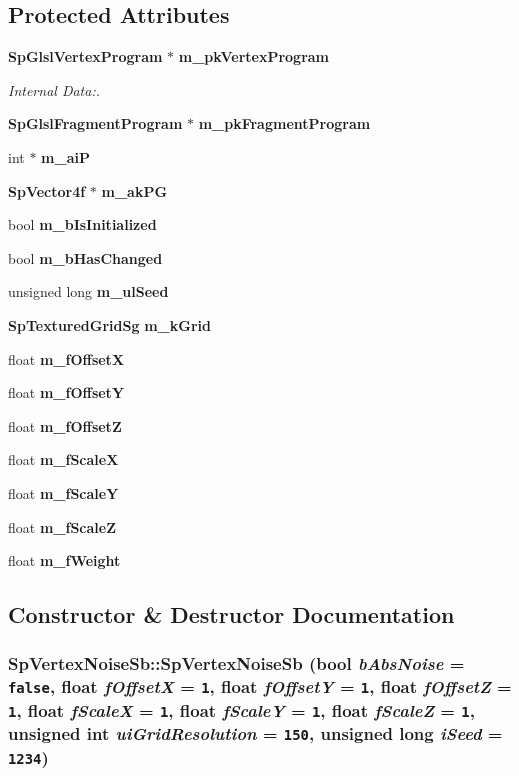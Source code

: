 \subsection*{Protected Attributes}
\begin{CompactItemize}
\item 
{\bf Sp\-Glsl\-Vertex\-Program} $\ast$ {\bf m\_\-pk\-Vertex\-Program}
\begin{CompactList}\small\item\em Internal Data:. \item\end{CompactList}\item 
{\bf Sp\-Glsl\-Fragment\-Program} $\ast$ {\bf m\_\-pk\-Fragment\-Program}
\item 
int $\ast$ {\bf m\_\-ai\-P}
\item 
{\bf Sp\-Vector4f} $\ast$ {\bf m\_\-ak\-PG}
\item 
bool {\bf m\_\-b\-Is\-Initialized}
\item 
bool {\bf m\_\-b\-Has\-Changed}
\item 
unsigned long {\bf m\_\-ul\-Seed}
\item 
{\bf Sp\-Textured\-Grid\-Sg} {\bf m\_\-k\-Grid}
\item 
float {\bf m\_\-f\-Offset\-X}
\item 
float {\bf m\_\-f\-Offset\-Y}
\item 
float {\bf m\_\-f\-Offset\-Z}
\item 
float {\bf m\_\-f\-Scale\-X}
\item 
float {\bf m\_\-f\-Scale\-Y}
\item 
float {\bf m\_\-f\-Scale\-Z}
\item 
float {\bf m\_\-f\-Weight}
\end{CompactItemize}


\subsection{Constructor \& Destructor Documentation}
\subsubsection{\setlength{\rightskip}{0pt plus 5cm}Sp\-Vertex\-Noise\-Sb::Sp\-Vertex\-Noise\-Sb (bool {\em b\-Abs\-Noise} = {\tt false}, float {\em f\-Offset\-X} = {\tt 1}, float {\em f\-Offset\-Y} = {\tt 1}, float {\em f\-Offset\-Z} = {\tt 1}, float {\em f\-Scale\-X} = {\tt 1}, float {\em f\-Scale\-Y} = {\tt 1}, float {\em f\-Scale\-Z} = {\tt 1}, unsigned int {\em ui\-Grid\-Resolution} = {\tt 150}, unsigned long {\em i\-Seed} = {\tt 1234})}\label{classSpark_1_1SpVertexNoiseSb_a0}


